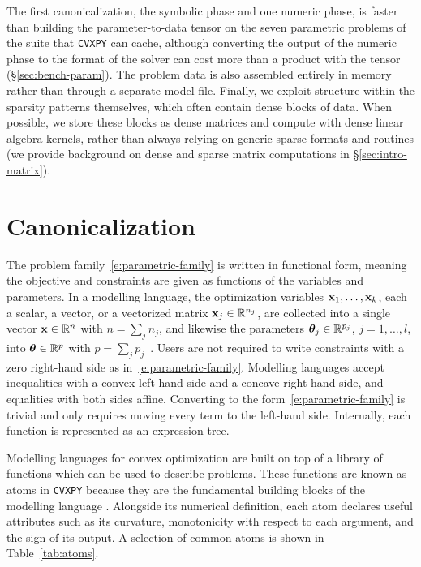 The first canonicalization, the symbolic phase and one numeric phase, is faster than building
the parameter-to-data tensor on the seven parametric problems of the suite that \texttt{CVXPY}
can cache, although converting the output of the numeric phase to the format of the
solver can cost more than a product with the tensor (\S\ref{sec:bench-param}).
The problem data is also assembled entirely in memory rather than through a separate model
file.
Finally, we exploit structure within the sparsity patterns themselves, which often contain dense
blocks of data.
When possible, we store these blocks as dense matrices and compute with dense linear algebra
kernels, rather than always relying on generic sparse formats and routines (we provide
background on dense and sparse matrix computations in \S\ref{sec:intro-matrix}).

\section{Canonicalization}\label{sec:intro-canon}
The problem family~\eqref{e:parametric-family} is written in functional form, meaning the
objective and constraints are given as functions of the variables and parameters.
In a modelling language, the optimization variables $\mathbf{x}_1,\ldots,\mathbf{x}_k$, each a
scalar, a vector, or a vectorized matrix $\mathbf{x}_j \in \mathbb{R}^{n_j}$, are collected into a single
vector $\mathbf{x} \in \mathbb{R}^n$ with $n = \sum_j n_j$, and likewise the parameters
$\bm{\theta}_j \in \mathbb{R}^{p_j}$, $j = 1,\ldots,l$, into $\bm{\theta} \in \mathbb{R}^p$ with
$p = \sum_j p_j$~\cite{boyd2004convex}.
Users are not required to write constraints with a zero right-hand side as
in~\eqref{e:parametric-family}.
Modelling languages accept inequalities with a convex left-hand
side and a concave right-hand side, and equalities with both sides affine.
Converting to the form~\eqref{e:parametric-family} is trivial and only requires moving every
term to the left-hand side.
Internally, each function is represented as an expression tree.

Modelling languages for convex optimization are built on top of a library of functions which can be
used to describe problems. These functions are known as atoms in \texttt{CVXPY} because they
are the fundamental building blocks of the modelling language \cite{grant2004disciplined}.
Alongside its numerical definition, each atom declares useful attributes such as
its curvature, monotonicity with respect to each argument, and the
sign of its output. A selection of common atoms is shown in Table~\ref{tab:atoms}.


